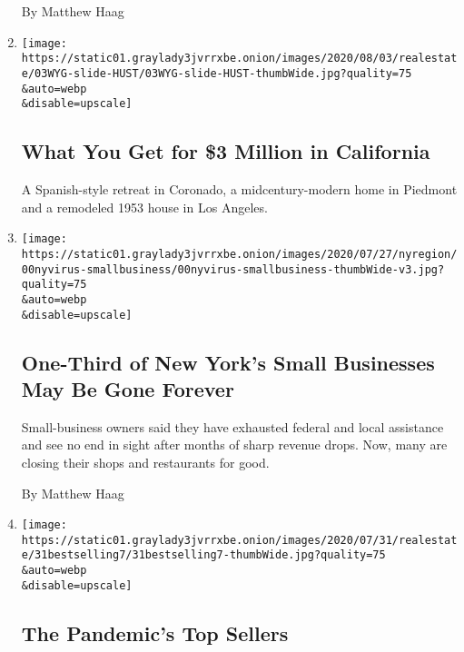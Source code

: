 \begin{enumerate}
  By Matthew Haag
\item
  \href{/slideshow/2020/08/03/realestate/what-you-get-for-3-million-in-california.html}{}

  \texttt{[image: https://static01.graylady3jvrrxbe.onion/images/2020/08/03/realestate/03WYG-slide-HUST/03WYG-slide-HUST-thumbWide.jpg?quality=75\\\&auto=webp\\\&disable=upscale]}

  \hypertarget{what-you-get-for-3-million-in-california}{%
  \subsection{What You Get for \$3 Million in
  California}\label{what-you-get-for-3-million-in-california}}

  A Spanish-style retreat in Coronado, a midcentury-modern home in
  Piedmont and a remodeled 1953 house in Los Angeles.
\item
  \href{/2020/08/03/nyregion/nyc-small-businesses-closing-coronavirus.html}{}

  \texttt{[image: https://static01.graylady3jvrrxbe.onion/images/2020/07/27/nyregion/00nyvirus-smallbusiness/00nyvirus-smallbusiness-thumbWide-v3.jpg?quality=75\\\&auto=webp\\\&disable=upscale]}

  \hypertarget{one-third-of-new-yorks-small-businesses-may-be-gone-forever}{%
  \subsection{One-Third of New York's Small Businesses May Be Gone
  Forever}\label{one-third-of-new-yorks-small-businesses-may-be-gone-forever}}

  Small-business owners said they have exhausted federal and local
  assistance and see no end in sight after months of sharp revenue
  drops. Now, many are closing their shops and restaurants for good.

  By Matthew Haag
\item
  \href{/slideshow/2020/07/31/realestate/the-pandemics-top-sellers.html}{}

  \texttt{[image: https://static01.graylady3jvrrxbe.onion/images/2020/07/31/realestate/31bestselling7/31bestselling7-thumbWide.jpg?quality=75\\\&auto=webp\\\&disable=upscale]}

  \hypertarget{the-pandemics-top-sellers}{%
  \subsection{The Pandemic's Top
  Sellers}\label{the-pandemics-top-sellers}}


\end{enumerate}
